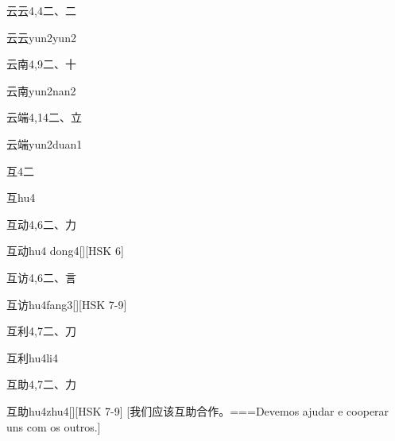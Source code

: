 \begin{Entry}{云云}{4,4}{⼆、⼆}
  \begin{Phonetics}{云云}{yun2yun2}
  \end{Phonetics}
\end{Entry}

\begin{Entry}{云南}{4,9}{⼆、⼗}
  \begin{Phonetics}{云南}{yun2nan2}
  \end{Phonetics}
\end{Entry}

\begin{Entry}{云端}{4,14}{⼆、⽴}
  \begin{Phonetics}{云端}{yun2duan1}
  \end{Phonetics}
\end{Entry}

\begin{Entry}{互}{4}{⼆}
  \begin{Phonetics}{互}{hu4}
  \end{Phonetics}
\end{Entry}

\begin{Entry}{互动}{4,6}{⼆、⼒}
  \begin{Phonetics}{互动}{hu4 dong4}[][HSK 6]
  \end{Phonetics}
\end{Entry}

\begin{Entry}{互访}{4,6}{⼆、⾔}
  \begin{Phonetics}{互访}{hu4fang3}[][HSK 7-9]
  \end{Phonetics}
\end{Entry}

\begin{Entry}{互利}{4,7}{⼆、⼑}
  \begin{Phonetics}{互利}{hu4li4}
  \end{Phonetics}
\end{Entry}

\begin{Entry}{互助}{4,7}{⼆、⼒}
  \begin{Phonetics}{互助}{hu4zhu4}[][HSK 7-9]
    [我们应该互助合作。===Devemos ajudar e cooperar uns com os outros.]
  \end{Phonetics}
\end{Entry}

